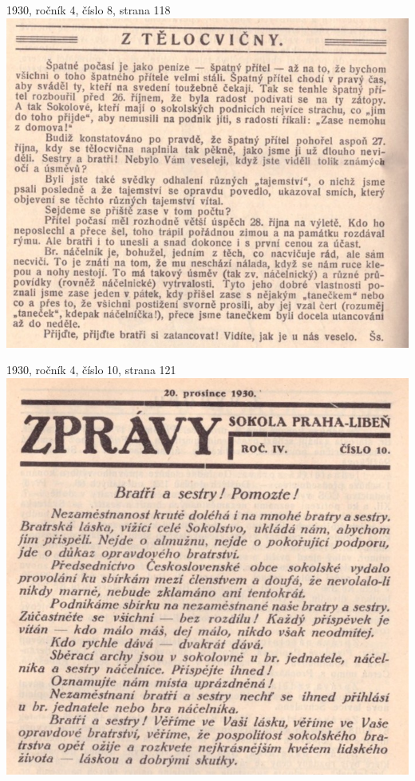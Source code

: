 \documentclass[11pt]{article}
\begin{document}
1930, ročník 4, číslo 8, strana 118 \\
\includegraphics[width=\imagewidth]{original/1930/Skener_20250316 (12).jpg}

1930, ročník 4, číslo 10, strana 121 \\
\includegraphics[width=\imagewidth]{original/1930/Skener_20250316 (15).jpg}
\end{document}

